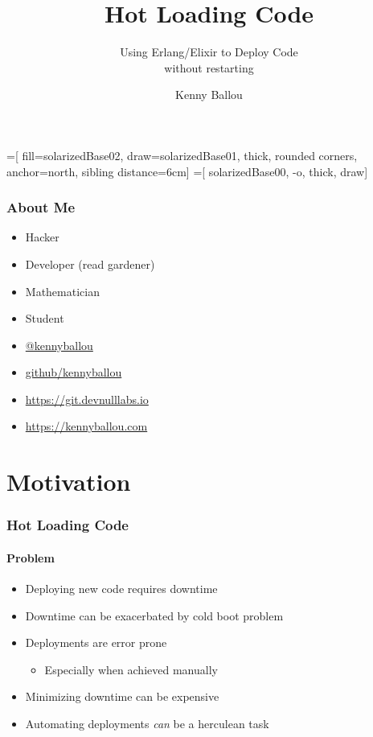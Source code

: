 \documentclass{beamer}
\title{Hot Loading Code}
\subtitle{Using Erlang/Elixir to Deploy Code \\{}
without restarting}
\author[Ballou]{Kenny Ballou}
\institute[/dev/null]{%
    \inst{}%
    /dev/null > labs
}
\begin{document}
=[%
    fill=solarizedBase02,
    draw=solarizedBase01,
    thick,
    rounded corners,
    anchor=north,
    sibling distance=6cm]
=[%
    solarizedBase00,
    -o,
    thick,
    draw]

\begin{frame}[label=titleslide]
\titlepage{}
\end{frame}

\begin{frame}
\tableofcontents[subsectionstyle=hide]
\end{frame}

\begin{frame}
\frametitle{About Me}
\begin{itemize}
\item{Hacker}
\item{Developer (read gardener)}
\item{Mathematician}
\item{Student}
\item{\href{https://twitter.com/kennyballou}{@kennyballou}}
\item{\href{https://github.com}{github/kennyballou}}
\item{\url{https://git.devnulllabs.io}}
\item{\url{https://kennyballou.com}}
\end{itemize}
\end{frame}

\section{Motivation}

\begin{frame}
\frametitle{Hot Loading Code}
\framesubtitle{Problem}
\begin{itemize}
\item{Deploying new code requires downtime}
\item{Downtime can be exacerbated by cold boot problem}
\item{Deployments are error prone}
\begin{itemize}
\item{Especially when achieved manually}
\end{itemize}
\item{Minimizing downtime can be expensive}
\item{Automating deployments \textit{can} be a herculean task}
\end{itemize}
\end{frame}
\end{document}
